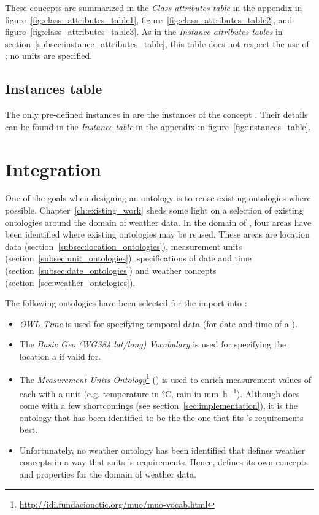These concepts are summarized in the \emph{Class attributes table} in the appendix in figure~\ref{fig:class_attributes_table1}, figure~\ref{fig:class_attributes_table2}, and figure~\ref{fig:class_attributes_table3}. As in the \emph{Instance attributes tables} in section~\ref{subsec:instance_attributes_table}, this table does not respect the use of \muo; no units are specified.

\subsection{Instances table}
\label{subsec:instances_table}

The only pre-defined instances in \thinkhomeweather are the instances of the concept . Their details can be found in the \emph{Instance table} in the appendix in figure~\ref{fig:instances_table}.

\section{Integration}
\label{sec:integration}

One of the goals when designing an ontology is to reuse existing ontologies where possible\cite{reuse1,reuse2}. Chapter~\ref{ch:existing_work} sheds some light on a selection of existing ontologies around the domain of weather data. In the domain of \thinkhomeweather, four areas have been identified where existing ontologies may be reused. These areas are location data (section~\ref{subsec:location_ontologies}), measurement units (section~\ref{subsec:unit_ontologies}), specifications of date and time (section~\ref{subsec:date_ontologies}) and weather concepts (section~\ref{sec:weather_ontologies}).

The following ontologies have been selected for the import into \thinkhomeweather:
\begin{itemize}
  \item \emph{OWL-Time}\cite{owl-time} is used for specifying temporal data (for date and time of a ).
  \item The \emph{Basic Geo (WGS84 lat/long) Vocabulary}\cite{wgs84_vocabulary} is used for specifying the location a  if valid for.
  \item The \emph{Measurement Units Ontology}\footnote{\href{http://idi.fundacionctic.org/muo/muo-vocab.html}{http://idi.fundacionctic.org/muo/muo-vocab.html}}\cite{MUO} (\muo) is used to enrich measurement values of each  with a unit (e.g. temperature in \si{\celsius}, rain in \si{\milli\metre\per\hour}). Although \muo does come with a few shortcomings (see section~\ref{sec:implementation}), it is the ontology that has been identified to be the the one that fits \thinkhomeweather's requirements best.
  \item Unfortunately, no weather ontology has been identified that defines weather concepts in a way that suits \thinkhomeweather's requirements. Hence, \thinkhomeweather defines its own concepts and properties for the domain of weather data.
\end{itemize}

